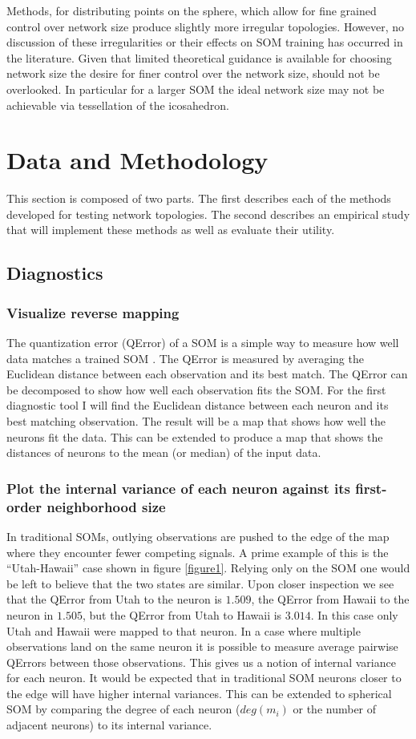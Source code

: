 \documentclass[10pt,titlepage]{article}
\begin{document}
Methods, for distributing points on the sphere, which allow for fine grained
control over network size produce slightly more irregular topologies.  However,
no discussion of these irregularities or their effects on SOM training has
occurred in the literature. Given that limited theoretical guidance is available
for choosing network size the desire for finer control over the network size,
should not be overlooked. In particular for a larger SOM the ideal network size
may not be achievable via tessellation of the icosahedron.

\section{Data and Methodology}
This section is composed of two parts.  The first describes each of
the methods developed for testing network topologies.  The second describes an
empirical study that will implement these methods as well as evaluate their
utility. 

\subsection{Diagnostics}
\subsubsection{Visualize reverse mapping}
The quantization error (QError) of a SOM is a simple way to measure how well 
data matches a trained SOM \citep{Kohonen2000}. The QError is measured by averaging
the Euclidean distance between each observation and its best match.  The QError can
be decomposed to show how well each observation fits the SOM.  For the first
diagnostic tool I will find the Euclidean distance between each neuron and its
best matching observation.  The result will be a map that shows how well the
neurons fit the data. This can be extended to produce a map that shows the
distances of neurons to the mean (or median) of the input data.

\subsubsection{Plot the internal variance of each neuron against its first-order neighborhood size}
In traditional SOMs, outlying observations are pushed to the edge of the map where
they encounter fewer competing signals. A prime example of this is the
``Utah-Hawaii'' case shown in figure \ref{figure1}.  Relying only on the SOM one
would be left to believe that the two states are similar. Upon closer inspection we see
that the QError from Utah to the neuron is $1.509$, the QError from Hawaii to
the neuron in $1.505$, but the QError from Utah to Hawaii is $3.014$. In this
case only Utah and Hawaii were mapped to that neuron.  In a case where multiple
observations land on the same neuron it is possible to measure average pairwise
QErrors between those observations.  This gives us a notion of internal variance for
each neuron. It would be expected that in traditional SOM neurons closer to the
edge will have higher internal variances. This can be extended to spherical SOM
by comparing the degree of each neuron ($deg(m_i)$ or the number of adjacent
neurons) to its internal variance.
\end{document}

